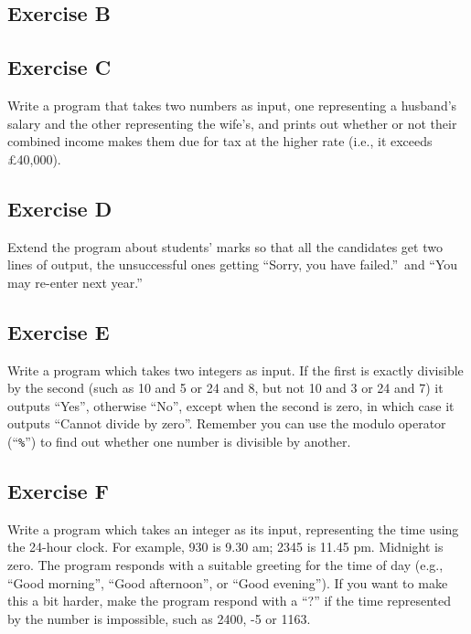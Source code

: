 \subsection*{Exercise B}



\subsection*{Exercise C}

Write a program that takes two numbers as input, one representing a
husband's salary and the other representing the wife's, and prints out
whether or not their combined income makes them due for tax at the higher rate
(i.e., it exceeds \pounds 40,000).

\subsection*{Exercise D}

Extend the program about students' marks so that all the candidates
get two lines of output, the unsuccessful ones getting ``Sorry, you
have failed.''\ and ``You may re-enter next year.''

\subsection*{Exercise E}

Write a program which takes two integers as input.
If the first is exactly divisible
by the second (such as 10 and 5 or 24 and 8, but not 10 and 3 or 24 and 7)
it outputs ``Yes'', otherwise ``No'', except when the second
is zero, in which case it outputs ``Cannot divide by zero''. Remember
you can use the modulo operator (``\texttt{\%}'') to find out whether one
number is divisible by another. 

\subsection*{Exercise F}

Write a program which takes an integer as its input, representing the time
using the 24-hour clock.  For example, 930 is 9.30 am; 2345 is 11.45 pm.  Midnight is
zero. The program responds with a suitable greeting for the time of day
(e.g., ``Good morning'', ``Good afternoon'', or ``Good evening'').
If you want to make this a bit harder, make the program respond with a ``?''
if the time represented by the number is impossible, such as 2400, -5 or
1163.

